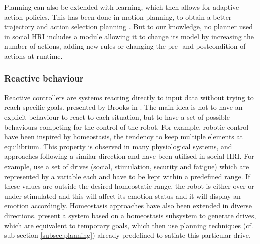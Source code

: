 

    Planning can also be extended with learning, which then allows for adaptive
    action policies. This has been done in motion planning, to obtain a better
    trajectory \citep{jain2013learning,beetz2004rpllearn} and action selection
    planning \citep{kirsch2009robot}. But to our knowledge, no planner used in
    social HRI includes a module allowing it to change its model by increasing
    the number of actions, adding new rules or changing the pre- and
    postcondition of actions at runtime.

\subsubsection{Reactive behaviour}

    Reactive controllers are systems reacting directly to input data without
    trying to reach specific goals. %
    presented by Brooks in \citep{brooks1986robust}. The main idea is not to
    have an explicit behaviour to react to each situation, but to have a set of
    possible behaviours competing for the control of the robot.  For example,
    robotic control have been inspired by homeostasis, the tendency to keep
    multiple elements at equilibrium. This property is observed in many
    physiological systems, and approaches following a similar direction and have
    been utilised in social HRI. For example, \citet{breazeal1998motivational}
    use a set of drives (social, stimulation, security and fatigue) which are
    represented by a variable each and have to be kept within a predefined
    range. If these values are outside the desired homeostatic range, the robot
    is either over or under-stimulated and this will affect its emotion status
    and it will display an emotion accordingly. Homeostasis approaches have also
    been extended in diverse directions. \citet{cao2014robee} present a system
    based on a homeostasis subsystem to generate drives, which are equivalent to
    temporary goals, which then use planning techniques (cf. sub-section
    \ref{subsec:planning}) already predefined to satiate this particular drive.  

